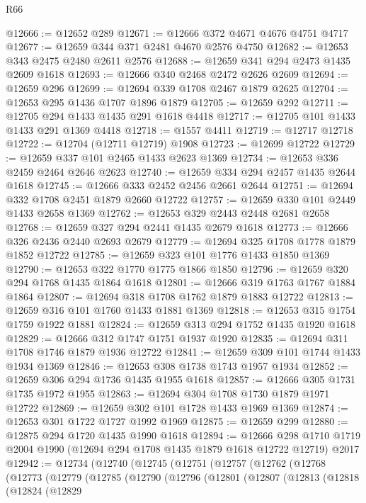 \begin{lexlean}{R66}
\begin{coremodule}
@12666 := @12652 @289
@12671 := @12666 @372 @4671 @4676 @4751 @4717
@12677 := @12659 @344 @371 @2481 @4670 @2576 @4750
@12682 := @12653 @343 @2475 @2480 @2611 @2576
@12688 := @12659 @341 @294 @2473 @1435 @2609 @1618
@12693 := @12666 @340 @2468 @2472 @2626 @2609
@12694 := @12659 @296
@12699 := @12694 @339 @1708 @2467 @1879 @2625
@12704 := @12653 @295 @1436 @1707 @1896 @1879
@12705 := @12659 @292
@12711 := @12705 @294 @1433 @1435 @291 @1618 @4418
@12717 := @12705 @101 @1433 @1433 @291 @1369 @4418
@12718 := @1557 @4411
@12719 := @12717 @12718
@12722 := @12704 (@12711 @12719) @1908
@12723 := @12699 @12722
@12729 := @12659 @337 @101 @2465 @1433 @2623 @1369
@12734 := @12653 @336 @2459 @2464 @2646 @2623
@12740 := @12659 @334 @294 @2457 @1435 @2644 @1618
@12745 := @12666 @333 @2452 @2456 @2661 @2644
@12751 := @12694 @332 @1708 @2451 @1879 @2660 @12722
@12757 := @12659 @330 @101 @2449 @1433 @2658 @1369
@12762 := @12653 @329 @2443 @2448 @2681 @2658
@12768 := @12659 @327 @294 @2441 @1435 @2679 @1618
@12773 := @12666 @326 @2436 @2440 @2693 @2679
@12779 := @12694 @325 @1708 @1778 @1879 @1852 @12722
@12785 := @12659 @323 @101 @1776 @1433 @1850 @1369
@12790 := @12653 @322 @1770 @1775 @1866 @1850
@12796 := @12659 @320 @294 @1768 @1435 @1864 @1618
@12801 := @12666 @319 @1763 @1767 @1884 @1864
@12807 := @12694 @318 @1708 @1762 @1879 @1883 @12722
@12813 := @12659 @316 @101 @1760 @1433 @1881 @1369
@12818 := @12653 @315 @1754 @1759 @1922 @1881
@12824 := @12659 @313 @294 @1752 @1435 @1920 @1618
@12829 := @12666 @312 @1747 @1751 @1937 @1920
@12835 := @12694 @311 @1708 @1746 @1879 @1936 @12722
@12841 := @12659 @309 @101 @1744 @1433 @1934 @1369
@12846 := @12653 @308 @1738 @1743 @1957 @1934
@12852 := @12659 @306 @294 @1736 @1435 @1955 @1618
@12857 := @12666 @305 @1731 @1735 @1972 @1955
@12863 := @12694 @304 @1708 @1730 @1879 @1971 @12722
@12869 := @12659 @302 @101 @1728 @1433 @1969 @1369
@12874 := @12653 @301 @1722 @1727 @1992 @1969
@12875 := @12659 @299
@12880 := @12875 @294 @1720 @1435 @1990 @1618
@12894 := @12666
    @298
    @1710
    @1719
    @2004
    @1990
    (@12694 @294 @1708 @1435 @1879 @1618 @12722 @12719)
    @2017
@12942 := @12734
    (@12740
      (@12745
        (@12751
          (@12757
            (@12762
              (@12768
                (@12773
                  (@12779
                    (@12785
                      (@12790
                        (@12796
                          (@12801
                            (@12807
                              (@12813
                                (@12818
                                  (@12824
                                    (@12829

\end{coremodule}
\end{lexlean}
